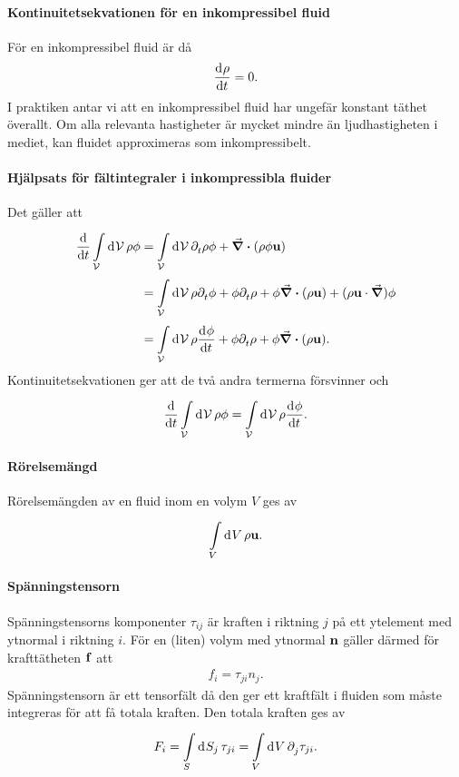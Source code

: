 \paragraph{Kontinuitetsekvationen för en inkompressibel fluid}
För en inkompressibel fluid är då
\begin{align*}
	\dv[]{\rho}{t} = 0.
\end{align*}
I praktiken antar vi att en inkompressibel fluid har ungefär konstant täthet överallt. Om alla relevanta hastigheter är mycket mindre än ljudhastigheten i mediet, kan fluidet approximeras som inkompressibelt.

\paragraph{Hjälpsats för fältintegraler i inkompressibla fluider}
Det gäller att
\begin{align*}
	\dv{t}\int\limits_{\mathcal{V}}^{}\dd[]{\mathcal{V}}\rho\phi &= \int\limits_{\mathcal{V}}^{}\dd[]{\mathcal{V}}\partial_{t}^{}\rho\phi + \div(\rho\phi\vb{u}) \\
	                                               &= \int\limits_{\mathcal{V}}^{}\dd[]{\mathcal{V}}\rho\partial_{t}^{}\phi + \phi\partial_{t}^{}\rho + \phi\div(\rho\vb{u}) + (\rho\vb{u}\cdot\grad)\phi \\
	                                               &= \int\limits_{\mathcal{V}}^{}\dd[]{\mathcal{V}}\rho\dv[]{\phi}{t} + \phi\partial_{t}^{}\rho + \phi\div(\rho\vb{u}).
\end{align*}
Kontinuitetsekvationen ger att de två andra termerna försvinner och
\begin{align*}
	\dv{t}\int\limits_{\mathcal{V}}^{}\dd[]{\mathcal{V}}\rho\phi =\int\limits_{\mathcal{V}}^{}\dd[]{\mathcal{V}}\rho\dv[]{\phi}{t}.
\end{align*}

\paragraph{Rörelsemängd}
Rörelsemängden av en fluid inom en volym $V$ ges av
\begin{align*}
	\int\limits_{V}^{}\dd[]{V}\rho\vb{u}.
\end{align*}

\paragraph{Spänningstensorn}
Spänningstensorns komponenter $\tau_{ij}$ är kraften i riktning $j$ på ett ytelement med ytnormal i riktning $i$. För en (liten) volym med ytnormal $\vb{n}$ gäller därmed för krafttätheten $\vb{f}$ att
\begin{align*}
	f_{i} = \tau_{ji}n_{j}.
\end{align*}
Spänningstensorn är ett tensorfält då den ger ett kraftfält i fluiden som måste integreras för att få totala kraften. Den totala kraften ges av
\begin{align*}
	F_{i} = \int\limits_{S}^{}\dd[]{S_{j}}\tau_{ji} = \int\limits_{V}^{}\dd[]{V}\partial_{j}^{}\tau_{ji}.
\end{align*}

